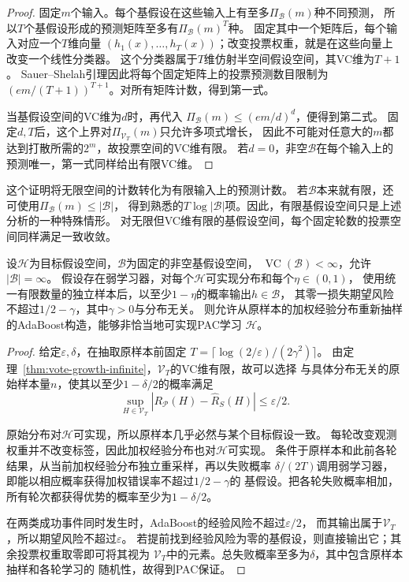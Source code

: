 \begin{proof}
固定$m$个输入。每个基假设在这些输入上有至多$\Pi_{\mathcal B}(m)$种不同预测，
所以$T$个基假设形成的预测矩阵至多有$\Pi_{\mathcal B}(m)^T$种。
固定其中一个矩阵后，每个输入对应一个$T$维向量
$(h_1(x),\ldots,h_T(x))$；改变投票权重，就是在这些向量上改变一个线性分类器。
这个分类器属于$T$维仿射半空间假设空间，其VC维为$T+1$。
Sauer--Shelah引理因此将每个固定矩阵上的投票预测数目限制为
$(em/(T+1))^{T+1}$。对所有矩阵计数，得到第一式。

当基假设空间的VC维为$d$时，再代入
$\Pi_{\mathcal B}(m)\leq(em/d)^d$，便得到第二式。
固定$d,T$后，这个上界对$\Pi_{\mathcal V_T}(m)$只允许多项式增长，
因此不可能对任意大的$m$都达到打散所需的$2^m$，故投票空间的VC维有限。
若$d=0$，非空$\mathcal B$在每个输入上的预测唯一，第一式同样给出有限VC维。
\end{proof}

这个证明将无限空间的计数转化为有限输入上的预测计数。
若$\mathcal B$本来就有限，还可使用$\Pi_{\mathcal B}(m)\leq|\mathcal B|$，
得到熟悉的$T\log|\mathcal B|$项。因此，有限基假设空间只是上述分析的一种特殊情形。
对无限但VC维有限的基假设空间，每个固定轮数的投票空间同样满足一致收敛。

\begin{theorem}[有限VC维基假设空间下的弱学习提升]
\label{thm:finite-class-boosting}
\label{thm:finite-vc-boosting}
设$\mathcal H$为目标假设空间，$\mathcal B$为固定的非空基假设空间，
$\operatorname{VC}(\mathcal B)<\infty$，允许$|\mathcal B|=\infty$。
假设存在弱学习器，对每个$\mathcal H$可实现分布和每个$\eta\in(0,1)$，
使用统一有限数量的独立样本后，以至少$1-\eta$的概率输出$h\in\mathcal B$，
其零一损失期望风险不超过$1/2-\gamma$，其中$\gamma>0$与分布无关。
则允许从原样本的加权经验分布重新抽样的AdaBoost构造，能够非恰当地可实现PAC学习
$\mathcal H$。
\end{theorem}

\begin{proof}
给定$\varepsilon,\delta$，在抽取原样本前固定
$T=\lceil\log(2/\varepsilon)/(2\gamma^2)\rceil$。
由定理~\ref{thm:vote-growth-infinite}，$\mathcal V_T$的VC维有限，故可以选择
与具体分布无关的原始样本量$n$，使其以至少$1-\delta/2$的概率满足
\[
 \sup_{H\in\mathcal V_T}|R_{\mathcal P}(H)-\hat R_S(H)|\leq\varepsilon/2.
\]

原始分布对$\mathcal H$可实现，所以原样本几乎必然与某个目标假设一致。
每轮改变观测权重并不改变标签，因此加权经验分布也对$\mathcal H$可实现。
条件于原样本和此前各轮结果，从当前加权经验分布独立重采样，再以失败概率
$\delta/(2T)$调用弱学习器，即能以相应概率获得加权错误率不超过$1/2-\gamma$的
基假设。把各轮失败概率相加，所有轮次都获得优势的概率至少为$1-\delta/2$。

在两类成功事件同时发生时，AdaBoost的经验风险不超过$\varepsilon/2$，
而其输出属于$\mathcal V_T$，所以期望风险不超过$\varepsilon$。
若提前找到经验风险为零的基假设，则直接输出它；其余投票权重取零即可将其视为
$\mathcal V_T$中的元素。总失败概率至多为$\delta$，其中包含原样本抽样和各轮学习的
随机性，故得到PAC保证。
\end{proof}

